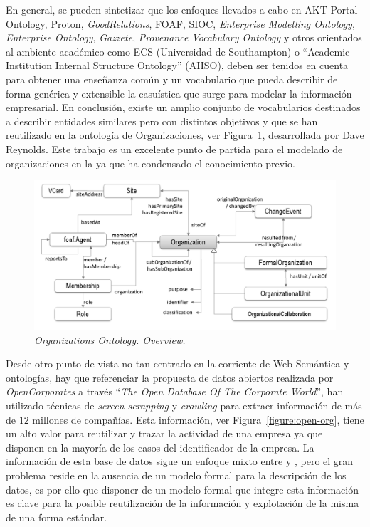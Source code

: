 En general, se pueden sintetizar que los enfoques llevados a cabo en AKT Portal Ontology, Proton,
\textit{GoodRelations}, \gls{FOAF}, \gls{SIOC}, \textit{Enterprise Modelling Ontology}, \textit{Enterprise Ontology}, \textit{Gazzete}, \textit{Provenance Vocabulary Ontology}
y otros orientados al ambiente académico como ECS (Universidad de Southampton) o ``Academic Institution Internal Structure Ontology'' (\gls{AIISO}), 
deben ser tenidos en cuenta para obtener una enseñanza común y un vocabulario que pueda describir de forma genérica
y extensible la casuística que surge para modelar la información empresarial. En conclusión, existe 
un amplio conjunto de vocabularios destinados a describir entidades similares pero con distintos objetivos
y que se han reutilizado en la ontología de Organizaciones, ver Figura~\ref{fig:org-ontology}, desarrollada por Dave Reynolds. Este trabajo
es un excelente punto de partida para el modelado de organizaciones en la \wode ya que ha condensado el conocimiento
previo.

\begin{figure}[h]
 \centering
    \includegraphics[width=14cm]{images/phd/org}
  \caption{\textit{Organizations Ontology. Overview.}}
 \label{fig:org-ontology}
\end{figure}

Desde otro punto de vista no tan centrado en la corriente de Web Semántica y ontologías, hay que referenciar 
la propuesta de datos abiertos realizada por \textit{OpenCorporates} a través ``\textit{The Open Database Of The Corporate World}'', han utilizado
técnicas de \textit{screen scrapping} y \textit{crawling} para extraer información de más de $12$ millones de compañías. Esta
información, ver Figura~\ref{figure:open-org}, tiene un alto valor para reutilizar y trazar la actividad de una empresa ya que disponen en la mayoría
de los casos del identificador de la empresa. La información de esta base de datos sigue un enfoque mixto entre \opendata y \linkeddata, 
pero el gran problema reside en la ausencia de un modelo formal para la descripción de los datos, es por ello que disponer de un modelo formal 
que integre esta información es clave para la posible reutilización de la información y explotación de la misma de una forma estándar.

